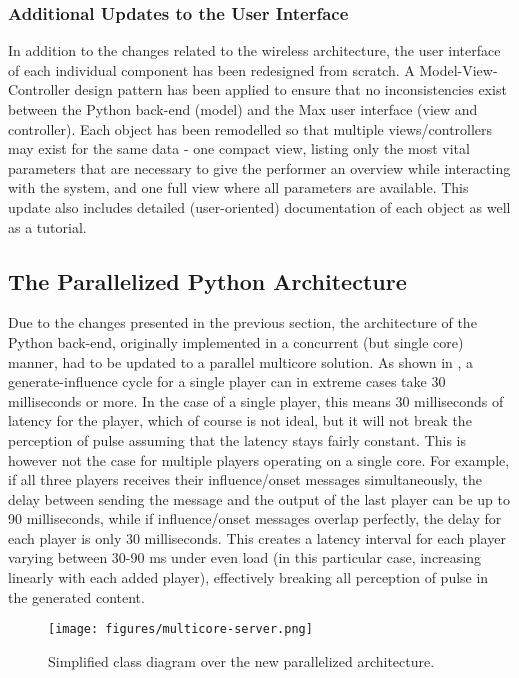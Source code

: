 \subsubsection{Additional Updates to the User Interface}
In addition to the changes related to the wireless architecture, the user interface of each individual component has been redesigned from  scratch. A Model-View-Controller design pattern has been applied to ensure that no inconsistencies exist between the Python back-end (model) and the Max user interface (view and controller). Each object has been remodelled so that multiple views/controllers may exist for the same data - one compact view, listing only the most vital parameters that are necessary to give the performer an overview while interacting with the system, and one full view where all parameters are available. This update also includes detailed (user-oriented) documentation of each object as well as a tutorial.


\subsection{The Parallelized Python Architecture}\label{ssec:python-architecture}
Due to the changes presented in the previous section, the architecture of the Python back-end, originally implemented in a concurrent (but single core) manner, had to be updated to a parallel multicore solution. As shown in \cite{somaxtheory2021}, a generate-influence cycle for a single player can in extreme cases take 30 milliseconds or more. In the case of a single player, this means 30 milliseconds of latency for the player, which of course is not ideal, but it will not break the perception of pulse assuming that the latency stays fairly constant. This is however not the case for multiple players operating on a single core. For example, if all three players receives their influence/onset messages simultaneously, the delay between sending the message and the output of the last player can be up to 90 milliseconds, while if influence/onset messages overlap perfectly, the delay for each player is only 30 milliseconds. This creates a latency interval for each player varying between 30-90 ms under even load (in this particular case, increasing linearly with each added player), effectively breaking all perception of pulse in the generated content.

 \begin{figure}[h!]
    \centering        
 	\texttt{[image: figures/multicore-server.png]}
    \caption{Simplified class diagram over the new parallelized architecture.}
    \label{fig:multicore-server-uml}
\end{figure}

